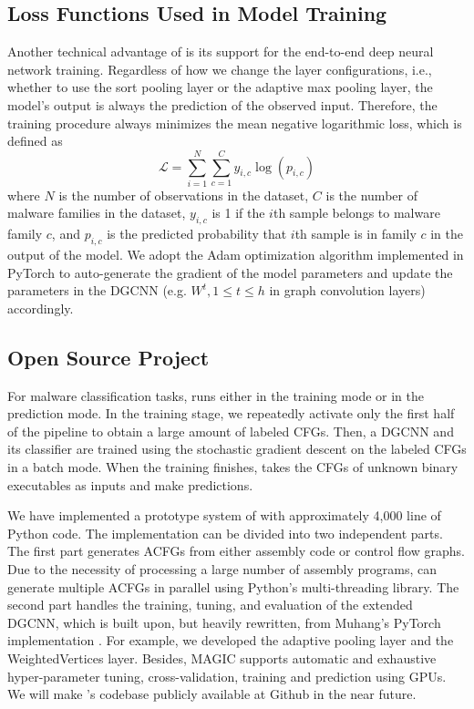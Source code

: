 \subsection{Loss Functions Used in Model Training}
Another technical advantage of \sysname is its support for the end-to-end deep neural network training.
Regardless of how we change the layer configurations, i.e., whether to use the sort pooling layer or the adaptive max pooling layer, the model's output is always the prediction of the observed input.
Therefore, the training procedure always minimizes the mean negative logarithmic loss, which is defined as
\begin{equation}
    \mathcal{L} = \sum_{i=1}^{N} \sum_{c=1}^{C} y_{i, c} \log(p_{i, c})
\end{equation}
where $N$ is the number of observations in the dataset, $C$ is the number of malware families in the dataset, 
$y_{i, c}$ is 1 if the $i$th sample belongs to malware family $c$,
and $p_{i, c}$ is the predicted probability that $i$th sample is in family $c$ in the output of the model.
We adopt the Adam optimization algorithm \cite{Adam} implemented in PyTorch \cite{PyTorch} to auto-generate the gradient of the model parameters and update the parameters in the DGCNN (e.g. $W^t, 1 \leq t \leq h$ in graph convolution layers) accordingly.

\subsection{Open Source \sysname Project}
For malware classification tasks, \sysname runs either in the training mode or in the prediction mode.
In the training stage, we repeatedly activate only the first half of the pipeline to obtain a large amount of labeled CFGs.
Then, a DGCNN and its classifier are trained using the stochastic gradient descent on the labeled CFGs in a batch mode.
When the training finishes, \sysname takes the CFGs of unknown binary executables as inputs and make predictions.

We have implemented a prototype system of \sysname with approximately 4,000 line of Python code.
The implementation can be divided into two independent parts.
The first part generates ACFGs from either assembly code or control flow graphs.
Due to the necessity of processing a large number of assembly programs, \sysname can generate multiple ACFGs in parallel using Python's multi-threading library.
The second part handles the training, tuning, and evaluation of the extended DGCNN, which is built upon, but heavily rewritten, from Muhang's PyTorch implementation \cite{MuhanDgcnn}.
For example, we developed the adaptive pooling layer and the WeightedVertices layer.
Besides, MAGIC supports automatic and exhaustive hyper-parameter tuning, cross-validation, training and prediction using GPUs.
We will make \sysname's codebase publicly available at Github in the near future.
